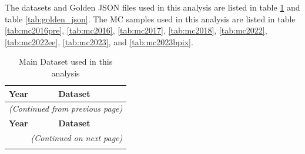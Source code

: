 \documentclass[twoside]{article}
\begin{document}
The datasets and Golden JSON files used in this analysis are listed in table \ref{tab:maindataset} and table \ref{tab:golden_json}. The MC samples used in this analysis are listed in table \ref{tab:mc2016pre}, \ref{tab:mc2016}, \ref{tab:mc2017}, \ref{tab:mc2018}, \ref{tab:mc2022}, \ref{tab:mc2022ee}, \ref{tab:mc2023}, and \ref{tab:mc2023bpix}.

\begin{longtable}{|l|l|}
\caption{Main Dataset used in this analysis} \label{tab:maindataset}\\
    
    \hline
    \textbf{Year} & \textbf{Dataset} \\
    \hline \hline
    \endfirsthead

    \multicolumn{2}{c}{\textit{(Continued from previous page)}} \\
    \hline
    \textbf{Year} & \textbf{Dataset} \\
    \hline \hline
    \endhead

    \hline
    \multicolumn{2}{r}{\textit{(Continued on next page)}} \\
    \endfoot


\end{longtable}
\end{document}
